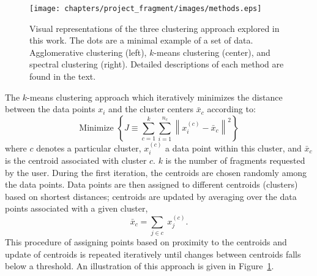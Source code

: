 \begin{figure}
    \centering
    \texttt{[image: chapters/project\_fragment/images/methods.eps]}
    \caption[Visual representations of the clustering approaches explored]{Visual representations of the three clustering approach explored in this work. The dots are a minimal example of a set of data.
    Agglomerative clustering (left), $k$-means clustering (center), and spectral clustering (right). Detailed descriptions of each method are found in the text.}
    \label{fig:methods}
\end{figure}
The $k$-means clustering approach which iteratively minimizes the distance between the data points $x_{i}$ and the cluster centers $\bar{x}_{c}$ according to: 
\begin{equation}\label{eq:km}
\text {Minimize } \left\{ J \equiv \sum_{c=1}^{k} \sum_{i=1}^{n_{c}}\left\|x_{i}^{(c)}  - \bar{x}_{c}\right\|^{2}\right\}
\end{equation}
where $c$ denotes a particular cluster, $x_i^{(c)}$ a data point within this cluster, and $\bar{x}_{c}$ is the centroid associated with cluster $c$. 
$k$ is the number of fragments requested by the user. 
During the first iteration, the centroids are chosen randomly among the data points. 
Data points are then assigned to different centroids (clusters) based on shortest distances; centroids are updated by averaging over the data points associated with a given cluster,
\begin{equation}
\bar{x}_{c} = \sum_{j \in c} \; x_{j}^{(c)}.
\end{equation}This procedure of assigning points based on proximity to the centroids and update of centroids is repeated iteratively until changes between centroids falls below a threshold.
An illustration of this approach is given in Figure~\ref{fig:methods}. 

